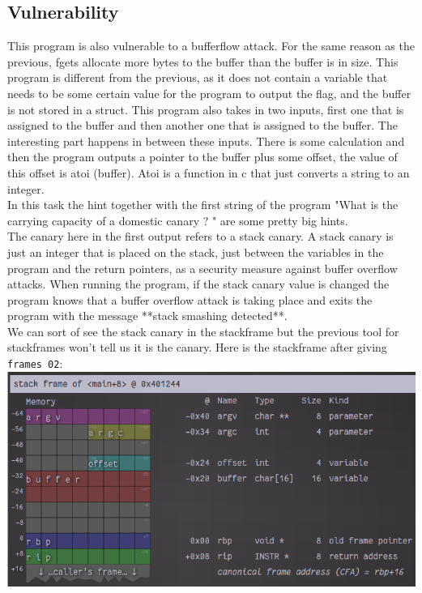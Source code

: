 \documentclass{article}
\begin{document}
\subsection{Vulnerability}
This program is also vulnerable to a bufferflow attack. For the same reason as the previous, fgets allocate more bytes to the buffer than the buffer is in size. This program is different from the previous, as it does not contain a variable that needs to be some certain value for the program to output the flag, and the buffer is not stored in a struct. This program also takes in two inputs, first one that is assigned to the buffer and then another one that is assigned to the buffer. The interesting part happens in between these inputs. There is some calculation and then the program outputs a pointer to the buffer plus some offset, the value of this offset is atoi (buffer). Atoi is a function in c that just converts a string to an integer. \\
In this task the hint together with the first string of the program "What is the carrying capacity of a domestic canary ? " are some pretty big hints.\\
The canary here in the first output refers to a stack canary. A stack canary is just an integer that is placed on the stack, just between the variables in the program and the return pointers, as a security measure against buffer overflow attacks. When running the program, if the stack canary value is changed the program knows that a buffer overflow attack is taking place and exits the program with the message **stack smashing detected**. \\
We can sort of see the stack canary in the stackframe but the previous tool for stackframes won't tell us it is the canary. Here is the stackframe after giving \lstinline{frames 02}: \\
\includegraphics[scale=0.5]{stackframe-02.png} \\
\end{document}
